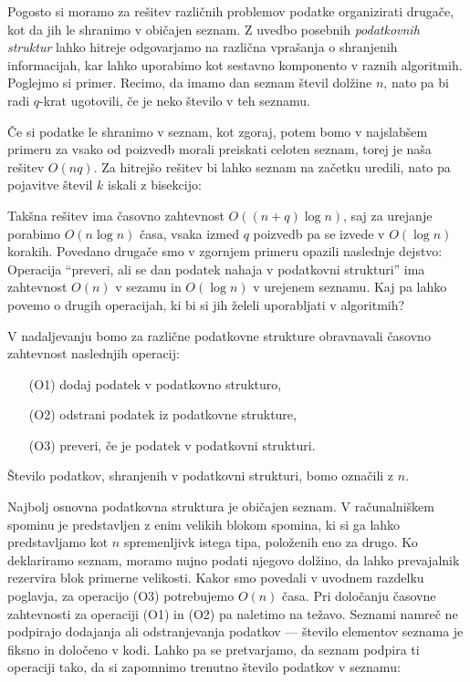 Pogosto si moramo za rešitev različnih problemov podatke organizirati drugače,
kot da jih le shranimo v običajen seznam.
Z uvedbo posebnih \emph{podatkovnih struktur} lahko hitreje odgovarjamo na
različna vprašanja o shranjenih informacijah, kar lahko uporabimo kot sestavno
komponento v raznih algoritmih.
Poglejmo si primer.
Recimo, da imamo dan seznam števil dolžine $n$, nato pa bi radi $q$-krat
ugotovili, če je neko število v teh seznamu.


Če si podatke le shranimo v seznam, kot zgoraj, potem bomo v najslabšem primeru
za vsako od poizvedb morali preiskati celoten seznam, torej je naša rešitev
$O(nq)$.
Za hitrejšo rešitev bi lahko seznam na začetku uredili, nato pa pojavitve števil
$k$ iskali z bisekcijo:


Takšna rešitev ima časovno zahtevnost $O((n + q) \log n)$, saj za urejanje
porabimo $O(n \log n)$ časa, vsaka izmed $q$ poizvedb pa se izvede v $O(\log n)$
korakih.
Povedano drugače smo v zgornjem primeru opazili naslednje dejstvo:
Operacija \enquote{preveri, ali se dan podatek nahaja v podatkovni strukturi}
ima zahtevnost $O(n)$ v sezamu in $O(\log n)$ v urejenem seznamu.
Kaj pa lahko povemo o drugih operacijah, ki bi si jih želeli uporabljati v
algoritmih?

V nadaljevanju bomo za različne podatkovne strukture obravnavali časovno
zahtevnost naslednjih operacij:
\begin{enumerate}
\item[(O1)] dodaj podatek v podatkovno strukturo,
\item[(O2)] odstrani podatek iz podatkovne strukture,
\item[(O3)] preveri, če je podatek v podatkovni strukturi.
\end{enumerate}
Število podatkov, shranjenih v podatkovni strukturi, bomo označili z $n$.


Najbolj osnovna podatkovna struktura je običajen seznam.
V računalniškem spominu je predstavljen z enim velikih blokom spomina, ki si ga
lahko predstavljamo kot $n$ spremenljivk istega tipa, položenih eno za drugo.
Ko deklariramo seznam, moramo nujno podati njegovo dolžino, da lahko prevajalnik
rezervira blok primerne velikosti.
Kakor smo povedali v uvodnem razdelku poglavja, za operacijo (O3) potrebujemo
$O(n)$ časa.
Pri določanju časovne zahtevnosti za operaciji (O1) in (O2) pa naletimo na
težavo.
Seznami namreč ne podpirajo dodajanja ali odstranjevanja podatkov --- število
elementov seznama je fiksno in določeno v kodi.
Lahko pa se pretvarjamo, da seznam podpira ti operaciji tako, da si zapomnimo
trenutno število podatkov v seznamu:

